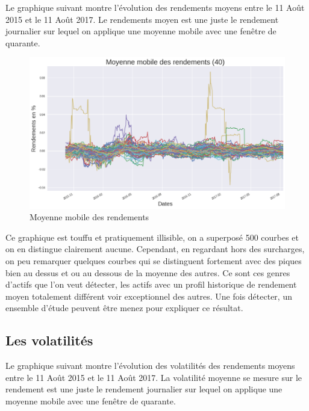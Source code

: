 Le graphique suivant montre l'évolution des rendements moyens entre le 11 Août 2015 et le 11 Août 2017. Le rendements moyen est une juste le rendement journalier sur lequel on applique une moyenne mobile avec une fenêtre de quarante.

\begin{figure}[H]
\centering
\caption{Moyenne mobile des rendements}
   \includegraphics[scale=0.5]{img/rendements.png}
\end{figure}

Ce graphique est touffu et pratiquement illisible, on a superposé 500 courbes et on en distingue clairement aucune. Cependant, en regardant hors des surcharges, on peu remarquer quelques courbes qui se distinguent fortement avec des piques bien au dessus et ou au dessous de la moyenne des autres. Ce sont ces genres d'actifs que l'on veut détecter, les actifs avec un profil historique de rendement moyen totalement différent voir exceptionnel des autres. Une fois détecter, un ensemble d'étude peuvent être menez pour expliquer ce résultat.

\subsection{Les volatilités}

Le graphique suivant montre l'évolution des volatilités des rendements moyens entre le 11 Août 2015 et le 11 Août 2017. La volatilité moyenne se mesure sur le rendement est une juste le rendement journalier sur lequel on applique une moyenne mobile avec une fenêtre de quarante.

